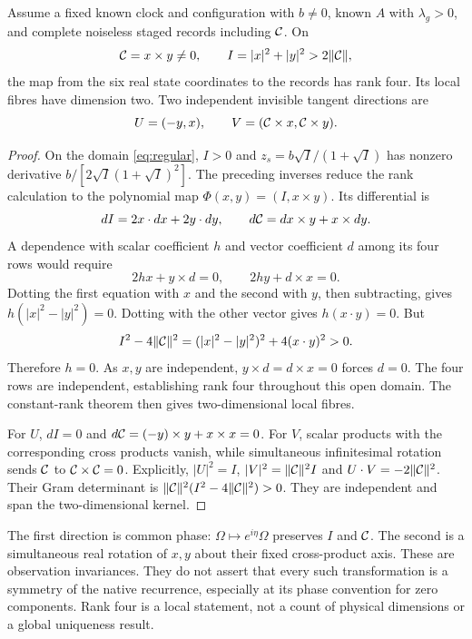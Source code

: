 \begin{theorem}\label{thm:rankfour}
Assume a fixed known clock and configuration with $b\ne0$, known $A$ with $\lambda_g>0$, and complete noiseless staged records including $\mathcal C$. On
\begin{equation}\label{eq:regular}
\mathcal C=x\times y\ne0,\qquad I=|x|^2+|y|^2>2\lVert\mathcal C\rVert,
\end{equation}
the map from the six real state coordinates to the records has rank four. Its local fibres have dimension two. Two independent invisible tangent directions are
\begin{equation}\label{eq:invisible}
U=(-y,x),\qquad V=(\mathcal C\times x,\mathcal C\times y).
\end{equation}
\end{theorem}
\begin{proof}
On the domain \eqref{eq:regular}, $I>0$ and $z_s=b\sqrt I/(1+\sqrt I)$ has nonzero derivative $b/[2\sqrt I(1+\sqrt I)^2]$. The preceding inverses reduce the rank calculation to the polynomial map $\Phi(x,y)=(I,x\times y)$. Its differential is
\[
dI=2x\cdot dx+2y\cdot dy,\qquad
d\mathcal C=dx\times y+x\times dy.
\]
A dependence with scalar coefficient $h$ and vector coefficient $d$ among its four rows would require
\begin{equation}\label{eq:rowdepend}
2h x+y\times d=0,\qquad 2h y+d\times x=0.
\end{equation}
Dotting the first equation with $x$ and the second with $y$, then subtracting, gives $h(|x|^2-|y|^2)=0$. Dotting with the other vector gives $h(x\cdot y)=0$. But
\[
I^2-4\lVert\mathcal C\rVert^2=(|x|^2-|y|^2)^2+4(x\cdot y)^2>0.
\]
Therefore $h=0$. As $x,y$ are independent, $y\times d=d\times x=0$ forces $d=0$. The four rows are independent, establishing rank four throughout this open domain. The constant-rank theorem then gives two-dimensional local fibres.

For $U$, $dI=0$ and $d\mathcal C=(-y)\times y+x\times x=0$. For $V$, scalar products with the corresponding cross products vanish, while simultaneous infinitesimal rotation sends $\mathcal C$ to $\mathcal C\times\mathcal C=0$. Explicitly, $|U|^2=I$, $|V|^2=\lVert\mathcal C\rVert^2I$ and $U\cdot V=-2\lVert\mathcal C\rVert^2$. Their Gram determinant is $\lVert\mathcal C\rVert^2(I^2-4\lVert\mathcal C\rVert^2)>0$. They are independent and span the two-dimensional kernel.
\end{proof}

The first direction is common phase: $\Omega\mapsto e^{i\eta}\Omega$ preserves $I$ and $\mathcal C$. The second is a simultaneous real rotation of $x,y$ about their fixed cross-product axis. These are observation invariances. They do not assert that every such transformation is a symmetry of the native recurrence, especially at its phase convention for zero components. Rank four is a local statement, not a count of physical dimensions or a global uniqueness result.

